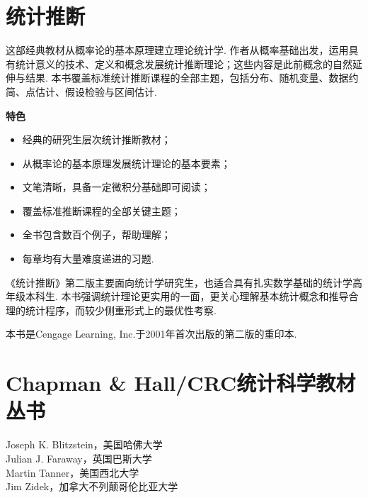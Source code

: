 \section*{统计推断}
这部经典教材从概率论的基本原理建立理论统计学. 作者从概率基础出发，运用具有统计意义的技术、定义和概念发展统计推断理论；这些内容是此前概念的自然延伸与结果. 本书覆盖标准统计推断课程的全部主题，包括分布、随机变量、数据约简、点估计、假设检验与区间估计.

\textbf{特色}
\begin{itemize}
\item 经典的研究生层次统计推断教材；
\item 从概率论的基本原理发展统计理论的基本要素；
\item 文笔清晰，具备一定微积分基础即可阅读；
\item 覆盖标准推断课程的全部关键主题；
\item 全书包含数百个例子，帮助理解；
\item 每章均有大量难度递进的习题.
\end{itemize}
《统计推断》第二版主要面向统计学研究生，也适合具有扎实数学基础的统计学高年级本科生. 本书强调统计理论更实用的一面，更关心理解基本统计概念和推导合理的统计程序，而较少侧重形式上的最优性考察.

本书是Cengage Learning, Inc.于2001年首次出版的第二版的重印本.
\clearpage
\section*{Chapman \& Hall/CRC统计科学教材丛书}
\noindent Joseph K. Blitzstein，美国哈佛大学\\
Julian J. Faraway，英国巴斯大学\\
Martin Tanner，美国西北大学\\
Jim Zidek，加拿大不列颠哥伦比亚大学

